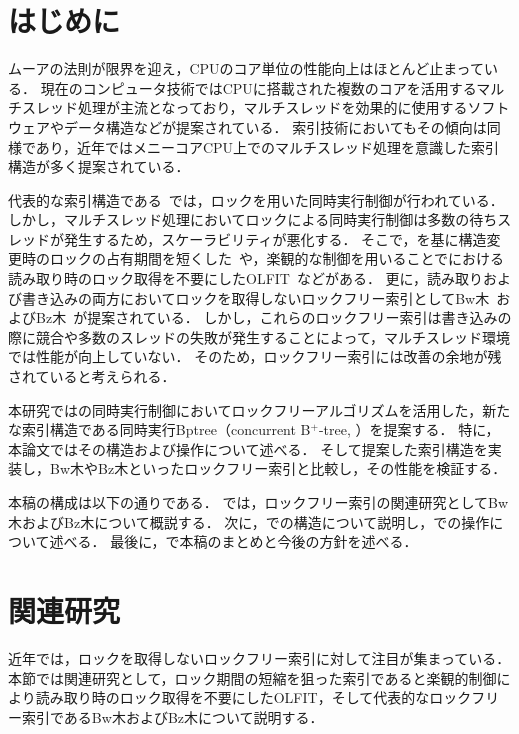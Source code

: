 
\section{はじめに}

ムーアの法則が限界を迎え，CPUのコア単位の性能向上はほとんど止まっている．
現在のコンピュータ技術ではCPUに搭載された複数のコアを活用するマルチスレッド処理が主流となっており，マルチスレッドを効果的に使用するソフトウェアやデータ構造などが提案されている．
索引技術においてもその傾向は同様であり，近年ではメニーコアCPU上でのマルチスレッド処理を意識した索引構造が多く提案されている．

代表的な索引構造である\Bptree{}~\cite{book:dbsystem}では，ロックを用いた同時実行制御が行われている．
しかし，マルチスレッド処理においてロックによる同時実行制御は多数の待ちスレッドが発生するため，スケーラビリティが悪化する．
そこで，\Bptree{}を基に構造変更時のロックの占有期間を短くした\Blinktree{}~\cite{tods1981:Lehman}や，楽観的な制御を用いることで\Blinktree{}における読み取り時のロック取得を不要にしたOLFIT~\cite{vldb2001:Cha}などがある．
更に，読み取りおよび書き込みの両方においてロックを取得しないロックフリー索引としてBw木~\cite{book:Bwtree}およびBz木~\cite{book:Bztree}が提案されている．
しかし，これらのロックフリー索引は書き込みの際に競合や多数のスレッドの失敗が発生することによって，マルチスレッド環境では性能が向上していない．
そのため，ロックフリー索引には改善の余地が残されていると考えられる．

本研究では\Bptree{}の同時実行制御においてロックフリーアルゴリズムを活用した，新たな索引構造である同時実行Bptree{}（concurrent B$^{+}$-tree, \Bctree{}）を提案する．
特に，本論文ではその構造および操作について述べる．
そして提案した索引構造を実装し，Bw木やBz木といったロックフリー索引と比較し，その性能を検証する．

本稿の構成は以下の通りである．
\Sec{\ref{sec:relatedwork}}では，ロックフリー索引の関連研究としてBw木およびBz木について概説する．
次に，\Sec{\ref{sec:bc_tree_structure}}で\Bctree{}の構造について説明し，\Sec{\ref{sec:bc_tree_operation}}で\Bctree{}の操作について述べる．
最後に，\Sec{\ref{sec:conclusion}}で本稿のまとめと今後の方針を述べる．

\section{関連研究}
\label{sec:relatedwork}

近年では，ロックを取得しないロックフリー索引に対して注目が集まっている．
本節では関連研究として，ロック期間の短縮を狙った索引である\Blinktree{}と楽観的制御により読み取り時のロック取得を不要にしたOLFIT，そして代表的なロックフリー索引であるBw木およびBz木について説明する．

